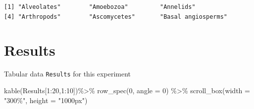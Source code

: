 \documentclass[
  letterpaper,
  DIV=11,
  numbers=noendperiod]{scrreprt}
\newenvironment{Shaded}{\begin{snugshade}}{\end{snugshade}}
\newcommand{\AttributeTok}[1]{\textcolor[rgb]{0.40,0.45,0.13}{#1}}
\newcommand{\DecValTok}[1]{\textcolor[rgb]{0.68,0.00,0.00}{#1}}
\newcommand{\FunctionTok}[1]{\textcolor[rgb]{0.28,0.35,0.67}{#1}}
\newcommand{\NormalTok}[1]{\textcolor[rgb]{0.00,0.23,0.31}{#1}}
\newcommand{\SpecialCharTok}[1]{\textcolor[rgb]{0.37,0.37,0.37}{#1}}
\newcommand{\StringTok}[1]{\textcolor[rgb]{0.13,0.47,0.30}{#1}}
\begin{document}
\begin{verbatim}
[1] "Alveolates"        "Amoebozoa"         "Annelids"         
[4] "Arthropods"        "Ascomycetes"       "Basal angiosperms"
\end{verbatim}

\hypertarget{results}{%
\section*{Results}\label{results}}


Tabular data \texttt{Results} for this experiment

\begin{Shaded}
\begin{Highlighting}[]
\FunctionTok{kable}\NormalTok{(Results[}\DecValTok{1}\SpecialCharTok{:}\DecValTok{20}\NormalTok{,}\DecValTok{1}\SpecialCharTok{:}\DecValTok{10}\NormalTok{])}\SpecialCharTok{\%\textgreater{}\%}
  \FunctionTok{row\_spec}\NormalTok{(}\DecValTok{0}\NormalTok{, }\AttributeTok{angle =} \DecValTok{0}\NormalTok{) }\SpecialCharTok{\%\textgreater{}\%}   
  \FunctionTok{scroll\_box}\NormalTok{(}\AttributeTok{width =} \StringTok{"300\%"}\NormalTok{, }\AttributeTok{height =} \StringTok{"1000px"}\NormalTok{)}
\end{Highlighting}
\end{Shaded}
\end{document}
